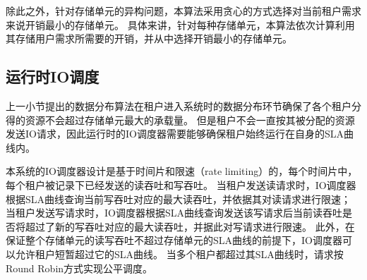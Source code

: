 除此之外，针对存储单元的异构问题，本算法采用贪心的方式选择对当前租户需求来说开销最小的存储单元。
具体来讲，针对每种存储单元，本算法依次计算利用其存储用户需求所需要的开销，并从中选择开销最小的存储单元。

\subsection{运行时IO调度}

上一小节提出的数据分布算法在租户进入系统时的数据分布环节确保了各个租户分得的资源不会超过存储单元最大的承载量。
但是租户不会一直按其被分配的资源发送IO请求，因此运行时的IO调度器需要能够确保租户始终运行在自身的SLA曲线内。

本系统的IO调度器设计是基于时间片和限速（rate limiting）的，每个时间片中，每个租户被记录下已经发送的读吞吐和写吞吐。
当租户发送读请求时，IO调度器根据SLA曲线查询当前写吞吐对应的最大读吞吐，并依据其对读请求进行限速；
当租户发送写请求时，IO调度器根据SLA曲线查询发送该写请求后当前读吞吐是否将超过了新的写吞吐对应的最大读吞吐，并据此对写请求进行限速。
此外，在保证整个存储单元的读写吞吐不超过存储单元的SLA曲线的前提下，IO调度器可以允许租户短暂超过它的SLA曲线。
当多个租户都超过其SLA曲线时，请求按Round Robin方式实现公平调度。